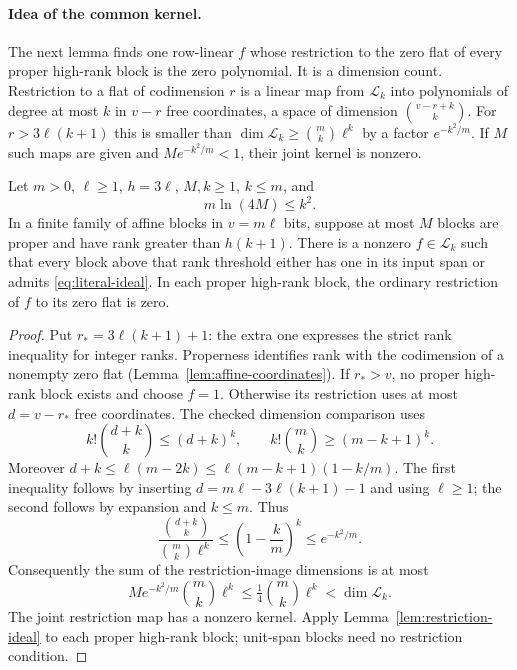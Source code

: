 \paragraph{Idea of the common kernel.}
The next lemma finds one row-linear \(f\) whose restriction to the zero flat
of every proper high-rank block is the zero polynomial. It is a dimension
count. Restriction to a flat of codimension \(r\) is a linear map from
\(\mathcal L_k\) into polynomials of degree at most \(k\) in \(v-r\) free
coordinates, a space of dimension \(\binom{v-r+k}{k}\). For
\(r>3\ell(k+1)\) this is smaller than \(\dim\mathcal L_k\ge\binom mk\ell^k\)
by a factor \(e^{-k^2/m}\). If \(M\) such maps are given and
\(Me^{-k^2/m}<1\), their joint kernel is nonzero.

\begin{lemma}\label{lem:kernel}
Let \(m>0\), \(\ell\ge1\), \(h=3\ell\), \(M,k\ge1\), \(k\le m\), and
\[
 m\ln(4M)\le k^2.
\]
In a finite family of affine blocks in \(v=m\ell\) bits, suppose at most
\(M\) blocks are proper and have rank greater than \(h(k+1)\).
There is a nonzero \(f\in\mathcal L_k\) such that every block above
that rank threshold either has one in its input span or admits
\eqref{eq:literal-ideal}. In each proper high-rank block, the ordinary
restriction of \(f\) to its zero flat is zero.
\end{lemma}
\begin{proof}
Put \(r_*=3\ell(k+1)+1\): the extra one expresses the strict rank
inequality for integer ranks. Properness identifies rank with the
codimension of a nonempty zero flat (Lemma~\ref{lem:affine-coordinates}).
If \(r_*>v\), no proper high-rank block
exists and choose \(f=1\). Otherwise its restriction uses at most
\(d=v-r_*\) free coordinates. The checked dimension comparison uses
\[
 k!\binom{d+k}{k}\le(d+k)^k,\qquad
 k!\binom mk\ge(m-k+1)^k.
\]
Moreover \(d+k\le\ell(m-2k)\le\ell(m-k+1)(1-k/m)\).
The first inequality follows by inserting \(d=m\ell-3\ell(k+1)-1\)
and using \(\ell\ge1\); the second follows by expansion and \(k\le m\).
Thus
\[
 \frac{\binom{d+k}{k}}{\binom mk\ell^k}
 \le\left(1-\frac{k}{m}\right)^k\le e^{-k^2/m}.
\]
Consequently the sum of the restriction-image dimensions is at most
\[
 M e^{-k^2/m}\binom mk\ell^k
 \le\tfrac14\binom mk\ell^k<\dim\mathcal L_k.
\]
The joint restriction map has a nonzero kernel. Apply
Lemma~\ref{lem:restriction-ideal} to each proper high-rank block;
unit-span blocks need no restriction condition.
\end{proof}

